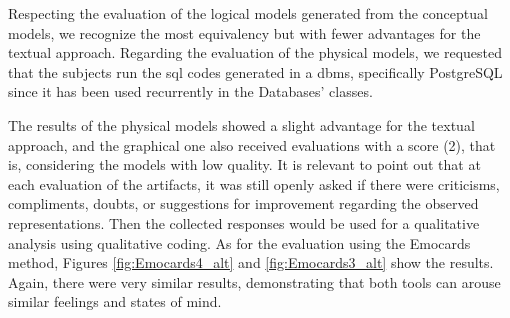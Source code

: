 Respecting the evaluation of the logical models generated from the conceptual models, we recognize the most equivalency but with fewer advantages for the textual approach.
Regarding the evaluation of the physical models, we requested that the subjects run the \ac{sql} codes generated in a \ac{dbms}, specifically PostgreSQL since it has been used recurrently in the Databases' classes.

The results of the physical models showed a slight advantage for the textual approach, and the graphical one also received evaluations with a score (2), that is, considering the models with low quality.
It is relevant to point out that at each evaluation of the artifacts, it was still openly asked if there were criticisms, compliments, doubts, or suggestions for improvement regarding the observed representations.
Then the collected responses would be used for a qualitative analysis using qualitative coding.
As for the evaluation using the Emocards method, Figures \ref{fig:Emocards4_alt} and \ref{fig:Emocards3_alt} show the results.
Again, there were very similar results, demonstrating that both tools can arouse similar feelings and states of mind.

